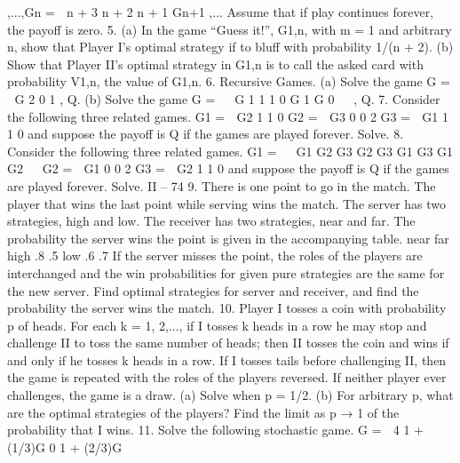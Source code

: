 ,...,Gn =
 n + 3 n + 2
n + 1 Gn+1
,...
Assume that if play continues forever, the payoff is zero.
5. (a) In the game “Guess it!”, G1,n, with m = 1 and arbitrary n, show that Player
I’s optimal strategy if to bluff with probability 1/(n + 2).
(b) Show that Player II’s optimal strategy in G1,n is to call the asked card with
probability V1,n, the value of G1,n.
6. Recursive Games. (a) Solve the game G =
 G 2
0 1
, Q.
(b) Solve the game G =
⎛
⎝
G 1 1
1 0 G
1 G 0
⎞
⎠ , Q.
7. Consider the following three related games.
G1 =
 G2 1
1 0
G2 =
 G3 0
0 2
G3 =
 G1 1
1 0
and suppose the payoff is Q if the games are played forever. Solve.
8. Consider the following three related games.
G1 =
⎛
⎝
G1 G2 G3
G2 G3 G1
G3 G1 G2
⎞
⎠ G2 =
 G1 0
0 2
G3 =
 G2 1
1 0
and suppose the payoff is Q if the games are played forever. Solve.
II – 74
9. There is one point to go in the match. The player that wins the last point while
serving wins the match. The server has two strategies, high and low. The receiver has
two strategies, near and far. The probability the server wins the point is given in the
accompanying table.
near far
high .8 .5
low .6 .7
If the server misses the point, the roles of the players are interchanged and the win probabilities
for given pure strategies are the same for the new server. Find optimal strategies
for server and receiver, and find the probability the server wins the match.
10. Player I tosses a coin with probability p of heads. For each k = 1, 2,..., if I tosses
k heads in a row he may stop and challenge II to toss the same number of heads; then II
tosses the coin and wins if and only if he tosses k heads in a row. If I tosses tails before
challenging II, then the game is repeated with the roles of the players reversed. If neither
player ever challenges, the game is a draw.
(a) Solve when p = 1/2.
(b) For arbitrary p, what are the optimal strategies of the players? Find the limit as p → 1
of the probability that I wins.
11. Solve the following stochastic game.
G =
 4 1 + (1/3)G
0 1 + (2/3)G

